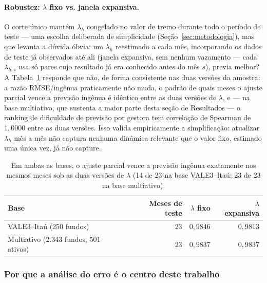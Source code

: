 \documentclass[11pt,a4paper]{article}
\begin{document}
\paragraph{Robustez: $\lambda$ fixo vs. janela expansiva.} O corte único mantém $\lambda_h$
congelado no valor de treino durante todo o período de teste --- uma escolha deliberada de
simplicidade (Seção~\ref{sec:metodologia}), mas que levanta a dúvida óbvia: um $\lambda_h$
reestimado a cada mês, incorporando os dados de teste já observados até ali (janela expansiva,
sem nenhum vazamento --- cada $\lambda_{h,s}$ usa só pares cujo resultado já era conhecido antes
do mês $s$), previa melhor? A Tabela~\ref{tab:janela_expansiva} responde que não, de forma
consistente nas duas versões da amostra: a razão RMSE/ingênua praticamente não muda, o padrão de
quais meses o ajuste parcial vence a previsão ingênua é idêntico entre as duas versões de
$\lambda$, e --- na base multiativo, que sustenta a maior parte desta seção de Resultados --- o
ranking de dificuldade de previsão por gestora tem correlação de Spearman de $1{,}0000$ entre as
duas versões. Isso valida empiricamente a simplificação: atualizar $\lambda_h$ mês a mês não
captura nenhuma dinâmica relevante que o valor fixo, estimado uma única vez, já não capture.

\begin{table}[h]\centering\small
\caption{$\lambda$ fixo (treino único) vs. janela expansiva (reestimado mês a mês, sem
vazamento), fora da amostra, $h=1$. Colunas 3--4: razão RMSE/RMSE ingênua.}
\label{tab:janela_expansiva}
\begin{tabular}{@{}p{4.6cm}rrr@{}}
\toprule
Base & Meses de teste & $\lambda$ fixo & $\lambda$ expansiva \\
\midrule
VALE3--Itaú (250 fundos) & 23 & $0{,}9846$ & $0{,}9813$ \\
Multiativo (2.343 fundos, 501 ativos) & 23 & $0{,}9837$ & $0{,}9837$ \\
\bottomrule
\end{tabular}
\caption*{\footnotesize Em ambas as bases, o ajuste parcial vence a previsão ingênua exatamente
nos mesmos meses sob as duas versões de $\lambda$ (14 de 23 na base VALE3--Itaú; 23 de 23 na base
multiativo).}
\end{table}

\subsubsection*{Por que a análise do erro é o centro deste trabalho}
\end{document}

